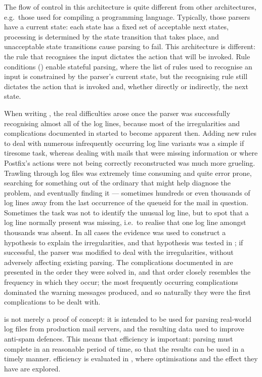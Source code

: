 The flow of control in this architecture is quite different from other
architectures, e.g.\ those used for compiling a programming language.
Typically, those parsers have a current state: each state has a fixed set
of acceptable next states, processing is determined by the state transition
that takes place, and unacceptable state transitions cause parsing to fail.
This architecture is different: the rule that recognises the input dictates
the action that will be invoked.  Rule conditions () enable stateful parsing, where the list of
rules used to recognise an input is constrained by the parser's current
state, but the recognising rule still dictates the action that is invoked
and, whether directly or indirectly, the next state.

When writing \parsername{}, the real difficulties arose once the parser was
successfully recognising almost all of the log lines, because most of the
irregularities and complications documented in 
started to become apparent then.  Adding new rules to deal with numerous
infrequently occurring log line variants was a simple if tiresome task,
whereas dealing with mails that were missing information or where Postfix's
actions were not being correctly reconstructed was much more grueling.
Trawling through log files was extremely time consuming and quite error
prone, searching for something out of the ordinary that might help diagnose
the problem, and eventually finding it --- sometimes hundreds or even
thousands of log lines away from the last occurrence of the queueid for the
mail in question.  Sometimes the task was not to identify the unusual log
line, but to spot that a log line normally present was missing, i.e.\ to
realise that one log line amongst thousands was absent.  In all cases the
evidence was used to construct a hypothesis to explain the irregularities,
and that hypothesis was tested in \parsername{}; if successful, the parser
was modified to deal with the irregularities, without adversely affecting
existing parsing.  The complications documented in
 are presented in the order they were solved in,
and that order closely resembles the frequency in which they occur; the
most frequently occurring complications dominated the warning messages
produced, and so naturally they were the first complications to be dealt
with.

\parsername{} is not merely a proof of concept: it is intended to be used
for parsing real-world log files from production mail servers, and the
resulting data used to improve anti-spam defences.  This means that
efficiency is important: parsing must complete in an reasonable period of
time, so that the results can be used in a timely manner.  \parsernames{}
efficiency is evaluated in , where
optimisations and the effect they have are explored.

